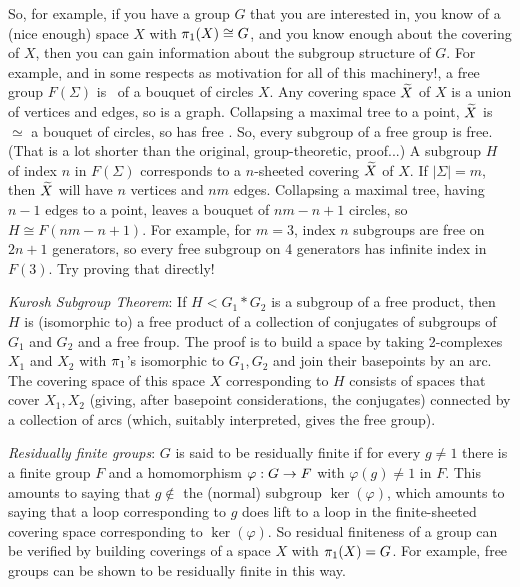 \msk

So, for example, if you have a group $G$ that you are interested in, you know of a (nice enough) 
space $X$ with $\pi_1(X)\cong G$, and you know enough about the covering of $X$, then you can
gain information about the subgroup structure of $G$. For example, and in some respects as
motivation for all of this machinery!, a free group $F(\Sigma)$ is \mpu\ of a bouquet of circles $X$. 
Any covering space $\widetilde{X}$ of $X$ is a union of vertices and edges, so is a graph.  Collapsing
a maximal tree to a point, $\widetilde{X}$ is $\simeq$ a bouquet of circles, so has free \mpu . So, every
subgroup of a free group is free. (That is a lot shorter than the original, group-theoretic, proof...) 
A subgroup $H$ of index $n$ in $F(\Sigma)$ corresponds to a $n$-sheeted covering $\widetilde{X}$ of $X$. If
$|\Sigma| = m$, then $\widetilde{X}$ will have $n$ vertices and $nm$ edges. Collapsing a maximal
tree, having $n-1$ edges to a point, leaves a bouquet of $nm-n+1$ circles, so $H\cong F(nm-n+1)$.
For example, for $m=3$, index $n$ subgroups are free on $2n+1$ generators, so every free subgroup
on 4 generators has infinite index in $F(3)$. Try proving that directly!

\msk

{\it Kurosh Subgroup Theorem}: If $H < G_1*G_2$ is a subgroup of
a free product, then $H$ is (isomorphic to) a free product of a
collection of conjugates of subgroups of $G_1$ and $G_2$ and a 
free froup. The proof is to build a space by taking 2-complexes
$X_1$ and $X_2$ with $\pi_1$'s isomorphic to $G_1,G_2$ and join
their basepoints by an arc. The covering space of this space $X$
corresponding to $H$ consists of spaces that cover $X_1,X_2$
(giving, after basepoint considerations, the conjugates)
connected by a collection of arcs (which, suitably interpreted,
gives the free group).

\msk

{\it Residually finite groups}: $G$ is said to be residually finite if for every $g\neq 1$ there is a 
finite group $F$ and a homomorphism $\varphi: G\rightarrow F$ with $\varphi(g)\neq 1$ in $F$. This 
amounts to saying that $g\notin$ the (normal) subgroup $\ker(\varphi)$, which amounts to
saying that a loop corresponding to $g$ does  lift to a loop in the finite-sheeted
covering space corresponding to $\ker(\varphi)$. So residual finiteness of a group can be
verified by building coverings of a space $X$ with $\pi_1(X)=G$. For example, free groups can be
shown to be residually finite in this way. 

